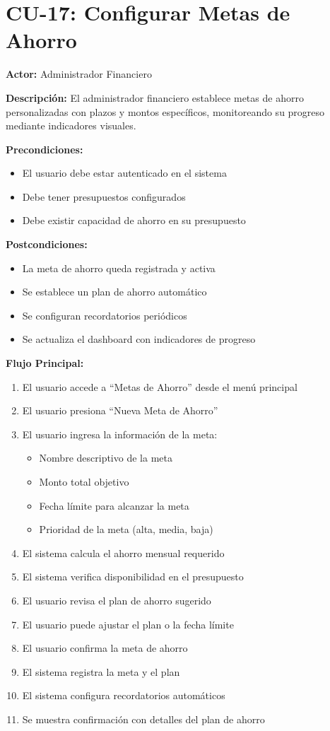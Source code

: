 \section{CU-17: Configurar Metas de Ahorro}

\noindent\textbf{Actor:} Administrador Financiero

\noindent\textbf{Descripción:} El administrador financiero establece metas de ahorro personalizadas con plazos y montos específicos, monitoreando su progreso mediante indicadores visuales.

\noindent\textbf{Precondiciones:}
\begin{itemize}
    \item El usuario debe estar autenticado en el sistema
    \item Debe tener presupuestos configurados
    \item Debe existir capacidad de ahorro en su presupuesto
\end{itemize}

\noindent\textbf{Postcondiciones:}
\begin{itemize}
    \item La meta de ahorro queda registrada y activa
    \item Se establece un plan de ahorro automático
    \item Se configuran recordatorios periódicos
    \item Se actualiza el dashboard con indicadores de progreso
\end{itemize}

\noindent\textbf{Flujo Principal:}
\begin{enumerate}
    \item El usuario accede a ``Metas de Ahorro'' desde el menú principal
    \item El usuario presiona ``Nueva Meta de Ahorro''
    \item El usuario ingresa la información de la meta:
    \begin{itemize}
        \item Nombre descriptivo de la meta
        \item Monto total objetivo
        \item Fecha límite para alcanzar la meta
        \item Prioridad de la meta (alta, media, baja)
    \end{itemize}
    \item El sistema calcula el ahorro mensual requerido
    \item El sistema verifica disponibilidad en el presupuesto
    \item El usuario revisa el plan de ahorro sugerido
    \item El usuario puede ajustar el plan o la fecha límite
    \item El usuario confirma la meta de ahorro
    \item El sistema registra la meta y el plan
    \item El sistema configura recordatorios automáticos
    \item Se muestra confirmación con detalles del plan de ahorro
\end{enumerate}

